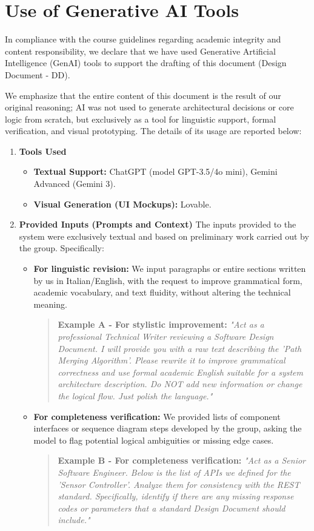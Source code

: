 \section{Use of Generative AI Tools}
In compliance with the course guidelines regarding academic integrity and content responsibility, we declare that we have used Generative Artificial Intelligence (GenAI) tools to support the drafting of this document (Design Document - DD).

We emphasize that the entire content of this document is the result of our original reasoning; AI was not used to generate architectural decisions or core logic from scratch, but exclusively as a tool for linguistic support, formal verification, and visual prototyping. The details of its usage are reported below:

\begin{enumerate}
    \item \textbf{Tools Used}
    \begin{itemize}
        \item \textbf{Textual Support:} ChatGPT (model GPT-3.5/4o mini), Gemini Advanced (Gemini 3).
        \item \textbf{Visual Generation (UI Mockups):} Lovable.
    \end{itemize}

    \item \textbf{Provided Inputs (Prompts and Context)} The inputs provided to the system were exclusively textual and based on preliminary work carried out by the group. Specifically:
    \begin{itemize}
        \item \textbf{For linguistic revision:} We input paragraphs or entire sections written by us in Italian/English, with the request to improve grammatical form, academic vocabulary, and text fluidity, without altering the technical meaning.
        \begin{quote}
            \textbf{Example A - For stylistic improvement:} \textit{"Act as a professional Technical Writer reviewing a Software Design Document. I will provide you with a raw text describing the 'Path Merging Algorithm'. Please rewrite it to improve grammatical correctness and use formal academic English suitable for a system architecture description. Do NOT add new information or change the logical flow. Just polish the language."}
        \end{quote}
        
        \item \textbf{For completeness verification:} We provided lists of component interfaces or sequence diagram steps developed by the group, asking the model to flag potential logical ambiguities or missing edge cases.
        \begin{quote}
            \textbf{Example B - For completeness verification:} \textit{"Act as a Senior Software Engineer. Below is the list of APIs we defined for the 'Sensor Controller'. Analyze them for consistency with the REST standard. Specifically, identify if there are any missing response codes or parameters that a standard Design Document should include."}
        \end{quote}
        

\end{itemize}
\end{enumerate}
